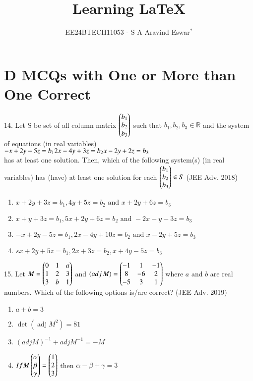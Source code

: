 \documentclass[journal,12pt,twocolumn]{IEEEtran}
\theoremstyle{remark}
\begin{document}

\vspace{3cm}

\title{Learning {\LaTeX}}
\author{EE24BTECH11053 - S A Aravind Eswar$^{*}$}
\maketitle
\newpage
\bigskip

\renewcommand{\thefigure}{\theenumi}
\renewcommand{\thetable}{\theenumi}
\section{D MCQs with One or More than One Correct}
14. Let S be set of all column matrix $\begin{pmatrix}
    b_1\\
    b_2\\
    b_3
\end{pmatrix}$ such that $b_1, b_2, b_3 \in \mathbb{R}$ and the system of equations (in real variables)\\ $
    \hfill -x+2y+5z=b_1\\
    \hfill 2x-4y+3z=b_2\\
    \hfill x-2y+2z=b_3
$\\ has at least one solution. Then, which of the following system(s) (in real variables) has (have) at least one solution for each $\begin{pmatrix}
    b_1\\
    b_2\\
    b_3
\end{pmatrix}\in S$ \hfill(JEE Adv. 2018)

\begin{enumerate}
    \item $x+2y+3z=b_1, 4y+5z=b_2 \text{ and }x+2y+6z=b_3$
    \item $x+y+3z=b_1, 5x+2y+6z=b_2\text{ and }-2x-y-3z=b_3$
    \item $-x+2y-5z=b_1,2x-4y+10z=b_2\text{ and }x-2y+5z=b_3$
    \item $sx+2y+5z=b_1,2x+3z=b_2,x+4y-5z=b_3$\\[2pt]
\end{enumerate}

15. Let $M=\begin{pmatrix}
    0 & 1 & a\\
    1 & 2 & 3\\
    3 & b & 1
\end{pmatrix}$ and $(\mathop{adj}M)=\begin{pmatrix}
    -1 & 1 & -1\\
    8 & -6 & 2\\
    -5 & 3 & 1
\end{pmatrix}$ where $a$ and $b$ are real numbers. Which of the following options is/are correct? \hfill (JEE Adv. 2019)

\begin{enumerate}
    \item $a+b=3$
    \item $\mathop{det}(\mathop{adj}M^2)=81$
    \item $(adjM)^{-1}+adjM^{-1}=-M$
    \item $If M\begin{pmatrix}
        \alpha\\
        \beta\\
        \gamma
\end{pmatrix} = \begin{pmatrix}
        1\\
        2\\
        3
\end{pmatrix}$ then $\alpha-\beta+\gamma=3$\\[2pt]
\end{enumerate}
\end{document}
